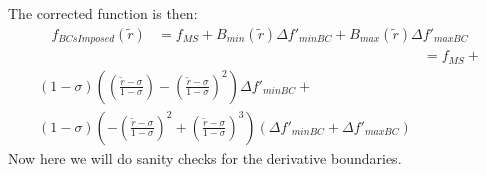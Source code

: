 \documentclass[a4paper]{article}
\begin{document}
The corrected function is then: 
\begin{align*}
    f_{BCsImposed} \left( \widetilde{r} \right) &= 
    f_{MS} + 
    B_{min}\left( \widetilde{r} \right) \Delta f'_{minBC} +
    B_{max}\left( \widetilde{r} \right) \Delta f'_{maxBC}
\end{align*}
\begin{align*}
    &= 
    f_{MS} + \\
    \left( 1 - \sigma \right) \left( 
        \left( \frac{\widetilde{r} - \sigma}{1 - \sigma} \right) 
        - \left( \frac{\widetilde{r} - \sigma}{1 - \sigma} \right) ^2
\right) \Delta f'_{minBC} + \\
\left( 1 - \sigma \right) \left( - \left( \frac{\widetilde{r} - \sigma}{1 - \sigma} \right)^2 + 
    \left( \frac{\widetilde{r} - \sigma}{1 - \sigma}  \right)^3
\right)
\left( \Delta f'_{minBC} + \Delta f'_{maxBC} \right) 
\end{align*}
%
Now here we will do sanity checks for the derivative boundaries.
%
%
%
%
%
%
%
%
%
\end{document}
